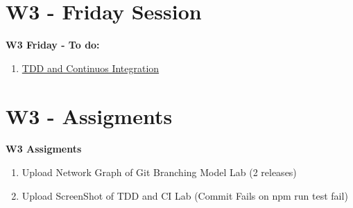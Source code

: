 \documentclass{beamer}
\begin{document}
\section{W3 - Friday Session }

\begin{frame}

\textbf{W3 Friday - To do:}

\begin{enumerate}
\item
	\href{https://github.com/adsoftsito/tdd/blob/master/w3/tdd_ci.pdf}{TDD and Continuos Integration} 
\end{enumerate} 


\end{frame}



\section{W3 - Assigments }

\begin{frame}


\textbf{W3 Assigments}


\begin{enumerate}
\item
	 
	Upload Network Graph of Git Branching Model Lab (2 releases)
\item
	Upload ScreenShot of TDD and CI Lab (Commit Fails on npm run test fail)

\end{enumerate} 


\end{frame}
\end{document}
